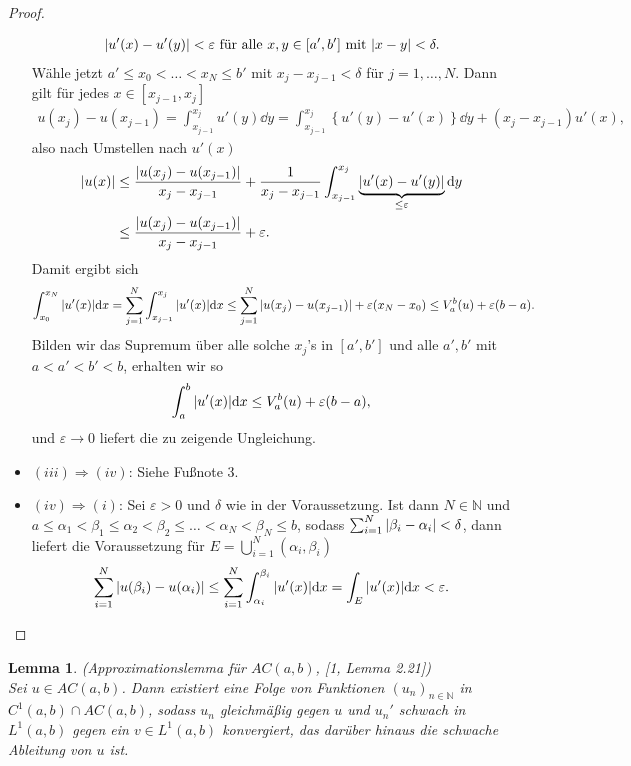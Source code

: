 \documentclass[twoside]{article}
\newtheorem{lemma}[theorem]{Lemma}
\theoremstyle{definition}
\newcommand{\N}{\mathbb{N}}
\newcommand{\lk}{\left(}
\newcommand{\rk}{\right)}
\newcommand{\lgk}{\left\{}
\newcommand{\rgk}{\right\}}
\begin{document}
\begin{proof}
\begin{itemize}
\begin{align*}
\abs{u'(x)-u'(y)} < \varepsilon \text{ für alle } x,y \in [a',b'] \text{ mit } \abs{x-y} < \delta.
\end{align*}
Wähle jetzt $a' \leq x_0 < \dots < x_N \leq b'$ mit $x_j -x_{j-1} < \delta$ für $j = 1, \dots, N$. Dann gilt für jedes $x \in [x_{j-1},x_j]$
\begin{align*}
u(x_j) - u(x_{j-1}) = \int_{x_{j-1}}^{x_j} u'(y) \dd y = \int_{x_{j-1}}^{x_j} \lgk u'(y) - u'(x) \rgk \dd y + (x_j-x_{j-1}) u'(x),
\end{align*}
also nach Umstellen nach $u'(x)$
\begin{align*}
\abs{u(x)} &\leq \frac{\abs{u(x_j)-u(x_{j-1})}}{x_j - x_{j-1}} + \frac{1}{x_j - x_{j-1}} \int_{x_{j-1}}^{x_j} \underbrace{\abs{u'(x)-u'(y)}}_{\leq \varepsilon} \dd y\\
&\leq \frac{\abs{u(x_j)-u(x_{j-1})}}{x_j - x_{j-1}} + \varepsilon.
\end{align*}
Damit ergibt sich
\begin{align*}
\int_{x_0}^{x_N} \abs{u'(x)} \dd x = \sum_{j=1}^N \int_{x_{j-1}}^{x_j} \abs{u'(x)} \dd x \leq \sum_{j=1}^N \abs{u(x_j)-u(x_{j-1})} + \varepsilon (x_N-x_0) \leq V^b_a(u) + \varepsilon (b-a).
\end{align*}
Bilden wir das Supremum über alle solche $x_j$'s in $[a',b']$ und alle $a',b'$ mit $a < a' < b' < b$, erhalten wir so
\begin{align*}
\int_a^b \abs{u'(x)} \dd x \leq V^b_a(u) + \varepsilon (b-a),
\end{align*}
und $\varepsilon \to 0$ liefert die zu zeigende Ungleichung.
\item $(iii) \Rightarrow (iv)$: Siehe Fußnote 3.
\item $(iv) \Rightarrow (i)$: Sei $\varepsilon > 0$ und $\delta$ wie in der Voraussetzung. Ist dann $N \in \N$ und $a \leq \alpha_1 < \beta_1 \leq \alpha_2 < \beta_2 \leq \dots < \alpha_N < \beta_N \leq b$, sodass $\sum_{i=1}^N \abs{\beta_i - \alpha_i}< \delta$, dann liefert die Voraussetzung für $E = \bigcup_{i=1}^N (\alpha_i,\beta_i)$
\begin{align*}
\sum_{i=1}^N \abs{u(\beta_i)-u(\alpha_i)} \leq \sum_{i = 1}^N \int_{\alpha_i}^{\beta_i} \abs{u'(x)} \dd x = \int_E \abs{u'(x)} \dd x < \varepsilon.
\end{align*}
\end{itemize}
\end{proof}
\begin{lemma} (Approximationslemma für $AC(a,b)$, [1, Lemma 2.21]) \label{lemma:approx} \\
Sei $u \in AC(a,b)$. Dann existiert eine Folge von Funktionen $\lk u_n \rk_{n \in \N}$ in $C^1(a,b) \cap AC(a,b)$, sodass $u_n$ gleichmäßig gegen $u$ und $u_n'$ schwach in $L^1(a,b)$ gegen ein $v \in L^1(a,b)$ konvergiert, das darüber hinaus die schwache Ableitung von $u$ ist.
\end{lemma}
\end{document}
